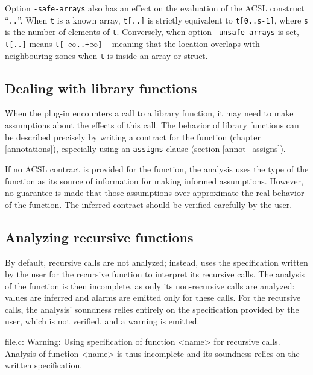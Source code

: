 \documentclass{frama-c-book}
\begin{document}
Option \lstinline|-safe-arrays| also has an effect on the evaluation
of the ACSL construct ``\lstinline|..|''. When \lstinline|t| is a
known array, \lstinline|t[..]| is strictly equivalent to
\lstinline|t[0..s-1]|, where \lstinline|s| is the number of elements
of \lstinline|t|. Conversely, when option \lstinline|-unsafe-arrays| is
set, \lstinline|t[..]| means
\lstinline|t[-|$\infty$\lstinline|..+|$\infty$\lstinline|]| -- meaning
that the location overlaps with neighbouring zones when \lstinline|t| is
inside an array or struct.

\subsection{Dealing with library functions}

When the \Eva{} plug-in encounters a call to a library
function, it may need to make assumptions about the effects of this call.
The behavior of library functions can be described precisely
by writing a contract for the function (chapter \ref{annotations}),
especially using an \lstinline|assigns| clause (section \ref{annot_assigns}).

If no ACSL contract is provided for the function, the analysis uses the
type of the function as its source of information for making
informed assumptions. However, no guarantee is made that those assumptions
over-approximate the real behavior of the function. The inferred
contract should be verified carefully by the user.

\subsection{Analyzing recursive functions}
\label{recursion}

By default, recursive calls are not analyzed; instead, \Eva{} uses the
specification written by the user for the recursive function to interpret
its recursive calls. The analysis of the function is then incomplete,
as only its non-recursive calls are analyzed: values are inferred and
alarms are emitted only for these calls.
For the recursive calls, the analysis' soundness relies entirely on the
specification provided by the user, which is not verified, and a warning
is emitted.

\begin{logsmath}
[eva] file.c: Warning:
  Using specification of function <name> for recursive calls.
  Analysis of function <name> is thus incomplete and its soundness
  relies on the written specification.
\end{logsmath}
\end{document}
